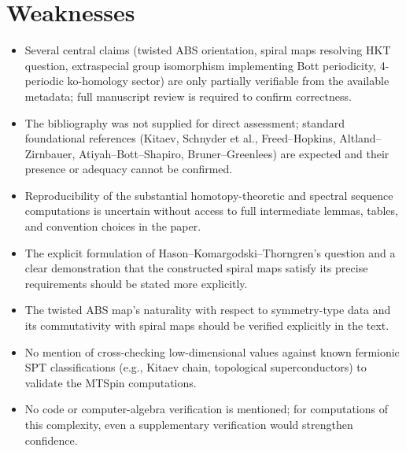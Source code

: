 \documentclass[11pt]{article}
\begin{document}
\section*{Weaknesses}
\begin{itemize}[leftmargin=*]
  \item Several central claims (twisted ABS orientation, spiral maps resolving HKT question, extraspecial group isomorphism implementing Bott periodicity, 4-periodic ko-homology sector) are only partially verifiable from the available metadata; full manuscript review is required to confirm correctness.
  \item The bibliography was not supplied for direct assessment; standard foundational references (Kitaev, Schnyder et al., Freed–Hopkins, Altland–Zirnbauer, Atiyah–Bott–Shapiro, Bruner–Greenlees) are expected and their presence or adequacy cannot be confirmed.
  \item Reproducibility of the substantial homotopy-theoretic and spectral sequence computations is uncertain without access to full intermediate lemmas, tables, and convention choices in the paper.
  \item The explicit formulation of Hason–Komargodski–Thorngren's question and a clear demonstration that the constructed spiral maps satisfy its precise requirements should be stated more explicitly.
  \item The twisted ABS map's naturality with respect to symmetry-type data and its commutativity with spiral maps should be verified explicitly in the text.
  \item No mention of cross-checking low-dimensional values against known fermionic SPT classifications (e.g., Kitaev chain, topological superconductors) to validate the MTSpin computations.
  \item No code or computer-algebra verification is mentioned; for computations of this complexity, even a supplementary verification would strengthen confidence.
\end{itemize}
\end{document}
